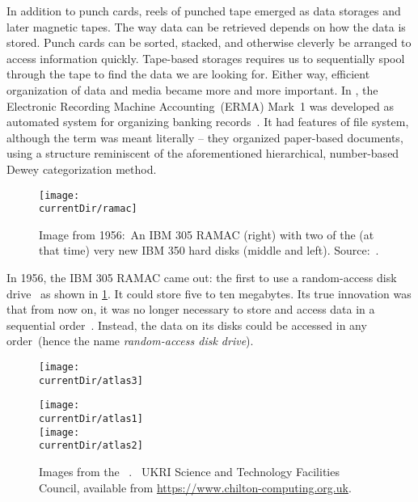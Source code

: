 In addition to punch cards, reels of punched tape emerged as data storages and later magnetic tapes.
The way data can be retrieved depends on how the data is stored.
Punch cards can be sorted, stacked, and otherwise cleverly be arranged to access information quickly.
Tape-based storages requires us to sequentially spool through the tape to find the data we are looking for.
Either way, efficient organization of data and media became more and more important.
In \citeyear{BIF1958OARORGIALSEP}, the Electronic Recording Machine Accounting~(ERMA) Mark~1 was developed as automated system for organizing banking records~\cite{BIF1958OARORGIALSEP}.
It had features of file system, although the term  was meant literally -- they organized paper-based documents, using a structure reminiscent of the aforementioned hierarchical, number-based Dewey categorization method.

\begin{figure}%
\centering%
\texttt{[image: \\currentDir/ramac]}%
\caption{Image from 1956:~An IBM 305 RAMAC (right) with two of the (at that time) very new IBM 350 hard disks (middle and left). %
Source:~\cite{G2016I3EKMUDDFW6}.}%
\label{fig:G2016I3EKMUDDFW6}%
\end{figure}%

In 1956, the IBM 305 RAMAC came out: the first to use a random-access disk drive~\cite{IRTFRADDRHBUCASTSFEFSFTE} as shown in \cref{fig:G2016I3EKMUDDFW6}.
It could store five to ten megabytes.
Its true innovation was that from now on, it was no longer necessary to store and access data in a sequential order~\cite{C20245YOQ}.
Instead, the data on its disks could be accessed in any order~(hence the name \emph{random-access disk drive}).

\begin{figure}%
\centering%
\floatSep%
\parbox{0.55\linewidth}{\centering%
\texttt{[image: \\currentDir/atlas3]}%
}%
\floatSep%
\parbox{0.35\linewidth}{\centering%
\texttt{[image: \\currentDir/atlas1]}\\[5pt]%
\texttt{[image: \\currentDir/atlas2]}%
}%
\floatSep%
%
\caption{Images from the ~\cite{M2025CC:FCSA1B1}. %
\textcopyright~UKRI Science and Technology Facilities Council, available from \url{https://www.chilton-computing.org.uk}.}%
\label{fig:M2025CC:FCSA1B1}%
\end{figure}%

